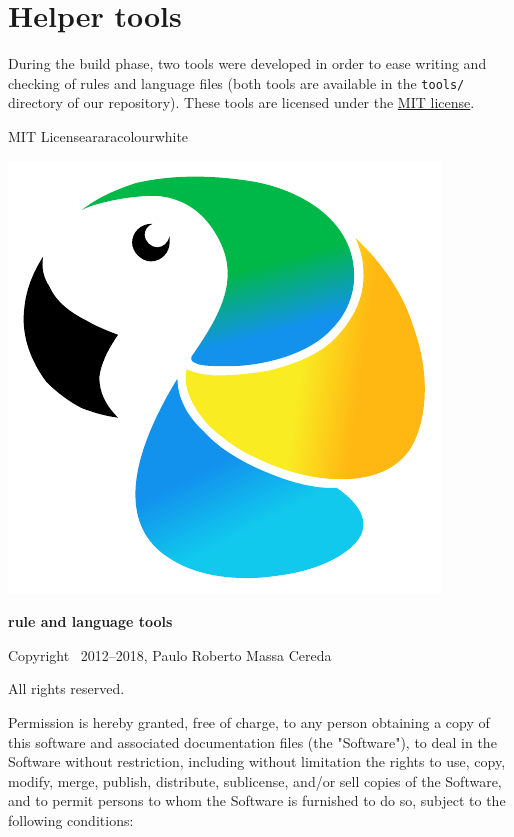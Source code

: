 \documentclass[a4paper,twoside,12pt]{memoir}
\begin{document}
\section*{Helper tools}

During the build phase, two tools were developed in order to ease writing and checking of rules and language files (both tools are available in the \verb|tools/| directory of our repository). These tools are licensed under the \href{https://opensource.org/licenses/MIT}{MIT license}.

\vspace{1em}

\begin{messagebox}{MIT License}{araracolour}{\icinfo}{white}
\begin{minipage}{0.09\textwidth}
\includegraphics[scale=.15]{../logos/bird.pdf}
\end{minipage}%
\begin{minipage}{0.8\textwidth}
\Large{}\selectfont\bfseries\color{araracolour} rule and language tools
\end{minipage}

\vspace{1em}

Copyright \textcopyright\ 2012--2018, Paulo Roberto Massa Cereda

All rights reserved.

\vspace{1em}

Permission is hereby granted, free of charge, to any person obtaining a copy of this software and associated documentation files (the "Software"), to deal in the Software without restriction, including without limitation the rights to use, copy, modify, merge, publish, distribute, sublicense, and/or sell copies of the Software, and to permit persons to whom the Software is furnished to do so, subject to the following conditions:


\end{messagebox}
\end{document}
